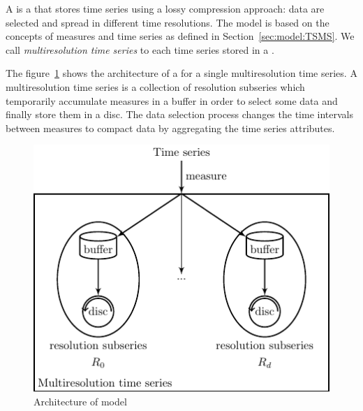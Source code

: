 A  is a  that stores time series using a lossy
compression approach: data are selected and spread in different time
resolutions. 
%
The  model is based on the concepts of measures and time
series as defined in Section~\ref{sec:model:TSMS}. We call
\emph{multiresolution time series} to each time series stored in a
.

The figure~\ref{fig:model:mtsdb} shows the architecture of a
 for a single multiresolution time series. A
multiresolution time series is a collection of resolution subseries
%
%
which temporarily accumulate measures in a buffer in order to select
some data and finally store them in a disc.
%
%
The data selection process
%
%
changes the time intervals between measures
to compact data by aggregating the time series attributes.

\begin{figure}
  \centering
  \includegraphics{fig_model_mtsdb.pdf}
  \caption{Architecture of  model}
  \label{fig:model:mtsdb}
\end{figure}


